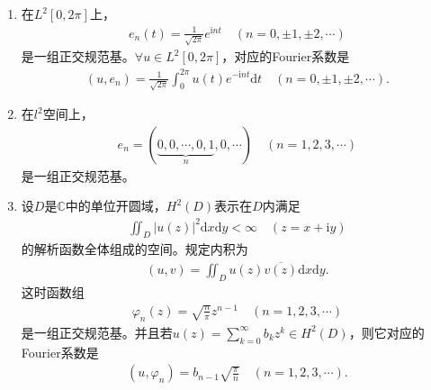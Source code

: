 \documentclass[../../main.tex]{subfiles}%
\begin{document}
\begin{proposition}\label{proposition:H2D空间--泛函分析}
\begin{enumerate}[(1)]
\item\label{proposition:H2D空间--泛函分析-1} 在$L^2[0, 2\pi]$上，
\begin{align*}
e_n(t) = \frac{1}{\sqrt{2\pi}} e^{\mathrm{i}nt} \quad (n=0, \pm1, \pm2, \cdots)
\end{align*}
是一组正交规范基。$\forall u \in L^2[0, 2\pi]$，对应的Fourier系数是
\begin{align*}
(u, e_n) = \frac{1}{\sqrt{2\pi}} \int_{0}^{2\pi} u(t) e^{-\mathrm{i}nt} \mathrm{d}t \quad (n=0, \pm1, \pm2, \cdots).
\end{align*}

\item\label{proposition:H2D空间--泛函分析-2} 在$l^2$空间上，
\begin{align*}
e_n = (\underbrace{0, 0, \cdots, 0, 1}_{n}, 0, \cdots) \quad (n=1,2,3,\cdots)
\end{align*}
是一组正交规范基。

\item\label{proposition:H2D空间--泛函分析-3} 设$D$是$\mathbb{C}$中的单位开圆域，$H^2(D)$表示在$D$内满足
\begin{align*}
\iint_{D} |u(z)|^2 \mathrm{d}x\mathrm{d}y < \infty \quad (z=x+\mathrm{i}y)
\end{align*}
的解析函数全体组成的空间。规定内积为
\begin{align*}
(u, v) = \iint_{D} u(z) \overline{v(z)} \mathrm{d}x\mathrm{d}y.
\end{align*}
这时函数组
\begin{align*}
\varphi_n(z) = \sqrt{\frac{n}{\pi}} z^{n-1} \quad (n=1,2,3,\cdots)
\end{align*}
是一组正交规范基。并且若$u(z) = \sum\limits_{k=0}^{\infty} b_k z^k \in H^2(D)$，则它对应的Fourier系数是
\begin{align*}
(u, \varphi_n)  = b_{n-1} \sqrt{\frac{\pi}{n}} \quad (n=1,2,3,\cdots).
\end{align*}
\end{enumerate}
\end{proposition}
\end{document}
